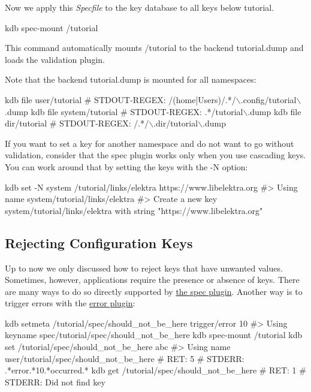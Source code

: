 Now we apply this {\itshape Specfile} to the key database to all keys below {\ttfamily tutorial}. 
\begin{DoxyCode}
kdb spec-mount /tutorial
\end{DoxyCode}
 This command automatically mounts {\ttfamily /tutorial} to the backend {\ttfamily tutorial.\+dump} and loads the validation plugin.




Note that the backend {\ttfamily tutorial.\+dump} is mounted for all namespaces\+: 
\begin{DoxyCode}
kdb file user/tutorial
# STDOUT-REGEX: /(home|Users)/.*/\(\backslash\).config/tutorial\(\backslash\).dump
kdb file system/tutorial
# STDOUT-REGEX: .*/tutorial\(\backslash\).dump
kdb file dir/tutorial
# STDOUT-REGEX: /.*/\(\backslash\).dir/tutorial\(\backslash\).dump
\end{DoxyCode}


If you want to set a key for another namespace and do not want to go without validation, consider that the spec plugin works only when you use cascading keys. You can work around that by setting the keys with the {\ttfamily -\/N} option\+: 
\begin{DoxyCode}
kdb set -N system /tutorial/links/elektra https://www.libelektra.org
#> Using name system/tutorial/links/elektra
#> Create a new key system/tutorial/links/elektra with string "https://www.libelektra.org"
\end{DoxyCode}


\subsection*{Rejecting Configuration Keys}

Up to now we only discussed how to reject keys that have unwanted values. Sometimes, however, applications require the presence or absence of keys. There are many ways to do so directly supported by \hyperlink{md_src_plugins_spec_README_src_plugins_spec_README_md}{the spec plugin}. Another way is to trigger errors with the \hyperlink{md_src_plugins_error_README_src_plugins_error_README_md}{error plugin}\+:


\begin{DoxyCode}
kdb setmeta /tutorial/spec/should\_not\_be\_here trigger/error 10
#> Using keyname spec/tutorial/spec/should\_not\_be\_here
kdb spec-mount /tutorial
kdb set /tutorial/spec/should\_not\_be\_here abc
#> Using name user/tutorial/spec/should\_not\_be\_here
# RET:    5
# STDERR: .*error.*10.*occurred.*
kdb get /tutorial/spec/should\_not\_be\_here
# RET: 1
# STDERR: Did not find key
\end{DoxyCode}


